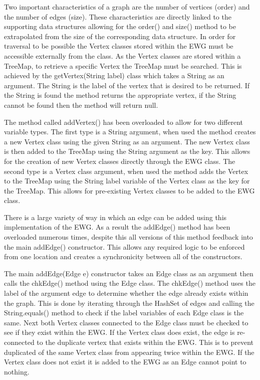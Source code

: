 \documentclass{AISB2008}
\begin{document}
{Two important characteristics of a graph are the number of vertices (order) and the number of edges (size). These characteristics are directly linked to the supporting data structures allowing for the order() and size() method to be extrapolated from the size of the corresponding data structure.
In order for traversal to be possible the Vertex classes stored within the EWG must be accessible externally from the class. As the Vertex classes are stored within a TreeMap, to retrieve a specific Vertex the TreeMap must be searched. This is achieved by the getVertex(String label) class which takes a String as an argument. The String is the label of the vertex that is desired to be returned. If the String is found the method returns the appropriate vertex, if the String cannot be found then the method will return null.

The method called addVertex() has been overloaded to allow for two different variable types. The first type is a String argument, when used the method creates a new Vertex class using the given String as an argument. The new Vertex class is then added to the TreeMap using the String argument as the key. This allows for the creation of new Vertex classes directly through the EWG class. The second type is a Vertex class argument, when used the method adds the Vertex to the TreeMap using the String label variable of the Vertex class as the key for the TreeMap. This allows for pre-existing Vertex classes to be added to the EWG class.

There is a large variety of way in which an edge can be added using this implementation of the EWG. As a result the addEdge() method has been overloaded numerous times, despite this all versions of this method feedback into the main addEdge() constructor. This allows any required logic to be enforced from one location and creates a synchronicity between all of the constructors.

The main addEdge(Edge e) constructor takes an Edge class as an argument then calls the chkEdge() method using the Edge class. The chkEdge() method uses the label of the argument edge to determine whether the edge already exists within the graph. This is done by iterating through the HashSet of edges and calling the String.equals() method to check if the label variables of each Edge class is the same. Next both Vertex classes connected to the Edge class must be checked to see if they exist within the EWG. If the Vertex class does exist, the edge is re-connected to the duplicate vertex that exists within the EWG. This is to prevent duplicated of the same Vertex class from appearing twice within the EWG. If the Vertex class does not exist it is added to the EWG as an Edge cannot point to nothing.

}
\end{document}
